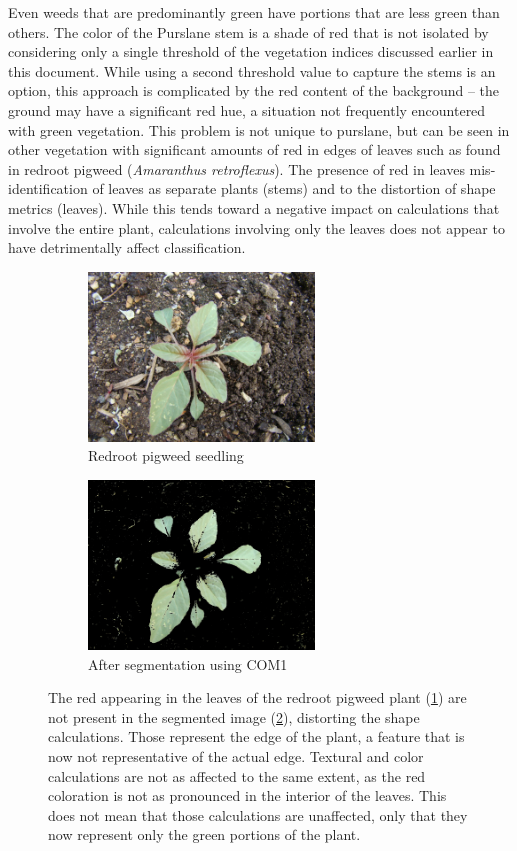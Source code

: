 \documentclass[letterpaper]{article}
\begin{document}
{Even weeds that are predominantly green have portions that are less green than others. The color of the Purslane stem is a shade of red that is not isolated by considering only a single threshold of the vegetation indices discussed earlier in this document. While using a second threshold value to capture the stems is an option, this approach is complicated by the red content of the background -- the ground may have a significant red hue, a situation not frequently encountered with green vegetation. This problem is not unique to purslane, but can be seen in other vegetation with significant amounts of red in edges of leaves such as found in redroot pigweed (\textit{Amaranthus retroflexus}).  The presence of red in leaves mis-identification of leaves as separate plants (stems) and to the distortion of shape metrics (leaves). While this tends toward a negative impact on calculations that involve the entire plant, calculations involving only the leaves does not appear to have detrimentally affect classification.

\begin{figure}[h!]
	\centering
	\begin{subfigure}[h]{.40\textwidth}
		\centering
		\includegraphics[width=6cm]{./figures/redroot-pigweed.jpg}
		\caption{Redroot pigweed seedling}
		\label{subfig:redroot-before}
	\end{subfigure}
	\begin{subfigure}[h]{.40\textwidth}
		\centering
		\includegraphics[width=6cm]{./figures/redroot-pigweed-COM1.jpg}
		\caption{After segmentation using COM1}
		\label{subfig:redroot-after}
	\end{subfigure}
	\caption[Red coloration within the leaves of redroot pigweed]{The red appearing in the leaves of the redroot pigweed plant (\ref{subfig:redroot-before}) are not present in the segmented image (\ref{subfig:redroot-after}), distorting the shape calculations. Those represent the edge of the plant, a feature that is now not representative of the actual edge. Textural and color calculations are not as affected to the same extent, as the red coloration is not as pronounced in the interior of the leaves. This does not mean that those calculations are unaffected, only that they now represent only the green portions of the plant.}
	\label{fig:redroot}
\end{figure}

}
\end{document}
